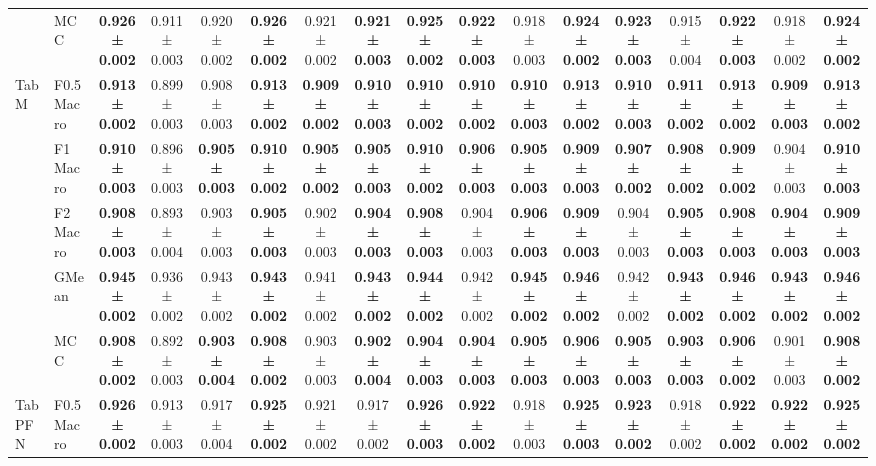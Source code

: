 \begin{table}[H]
{\begin{tabular}{llccccccccccccccc}
 & MCC & \textbf{0.926 ± 0.002} & 0.911 ± 0.003 & 0.920 ± 0.002 & \textbf{0.926 ± 0.002} & 0.921 ± 0.002 & \textbf{0.921 ± 0.003} & \textbf{0.925 ± 0.002} & \textbf{0.922 ± 0.003} & 0.918 ± 0.003 & \textbf{0.924 ± 0.002} & \textbf{0.923 ± 0.003} & 0.915 ± 0.004 & \textbf{0.922 ± 0.003} & 0.918 ± 0.002 & \textbf{0.924 ± 0.002} \\
\cline{1-17}
\multirow[t]{5}{*}{TabM} & F0.5 Macro & \textbf{0.913 ± 0.002} & 0.899 ± 0.003 & 0.908 ± 0.003 & \textbf{0.913 ± 0.002} & \textbf{0.909 ± 0.002} & \textbf{0.910 ± 0.003} & \textbf{0.910 ± 0.002} & \textbf{0.910 ± 0.002} & \textbf{0.910 ± 0.003} & \textbf{0.913 ± 0.002} & \textbf{0.910 ± 0.003} & \textbf{0.911 ± 0.002} & \textbf{0.913 ± 0.002} & \textbf{0.909 ± 0.003} & \textbf{0.913 ± 0.002} \\
 & F1 Macro & \textbf{0.910 ± 0.003} & 0.896 ± 0.003 & \textbf{0.905 ± 0.003} & \textbf{0.910 ± 0.002} & \textbf{0.905 ± 0.002} & \textbf{0.905 ± 0.003} & \textbf{0.910 ± 0.002} & \textbf{0.906 ± 0.003} & \textbf{0.905 ± 0.003} & \textbf{0.909 ± 0.003} & \textbf{0.907 ± 0.002} & \textbf{0.908 ± 0.002} & \textbf{0.909 ± 0.002} & 0.904 ± 0.003 & \textbf{0.910 ± 0.003} \\
 & F2 Macro & \textbf{0.908 ± 0.003} & 0.893 ± 0.004 & 0.903 ± 0.003 & \textbf{0.905 ± 0.003} & 0.902 ± 0.003 & \textbf{0.904 ± 0.003} & \textbf{0.908 ± 0.003} & 0.904 ± 0.003 & \textbf{0.906 ± 0.003} & \textbf{0.909 ± 0.003} & 0.904 ± 0.003 & \textbf{0.905 ± 0.003} & \textbf{0.908 ± 0.003} & \textbf{0.904 ± 0.003} & \textbf{0.909 ± 0.003} \\
 & GMean & \textbf{0.945 ± 0.002} & 0.936 ± 0.002 & 0.943 ± 0.002 & \textbf{0.943 ± 0.002} & 0.941 ± 0.002 & \textbf{0.943 ± 0.002} & \textbf{0.944 ± 0.002} & 0.942 ± 0.002 & \textbf{0.945 ± 0.002} & \textbf{0.946 ± 0.002} & 0.942 ± 0.002 & \textbf{0.943 ± 0.002} & \textbf{0.946 ± 0.002} & \textbf{0.943 ± 0.002} & \textbf{0.946 ± 0.002} \\
 & MCC & \textbf{0.908 ± 0.002} & 0.892 ± 0.003 & \textbf{0.903 ± 0.004} & \textbf{0.908 ± 0.002} & 0.903 ± 0.003 & \textbf{0.902 ± 0.004} & \textbf{0.904 ± 0.003} & \textbf{0.904 ± 0.003} & \textbf{0.905 ± 0.003} & \textbf{0.906 ± 0.003} & \textbf{0.905 ± 0.003} & \textbf{0.903 ± 0.003} & \textbf{0.906 ± 0.002} & 0.901 ± 0.003 & \textbf{0.908 ± 0.002} \\
\cline{1-17}
\multirow[t]{5}{*}{TabPFN} & F0.5 Macro & \textbf{0.926 ± 0.002} & 0.913 ± 0.003 & 0.917 ± 0.004 & \textbf{0.925 ± 0.002} & 0.921 ± 0.002 & 0.917 ± 0.002 & \textbf{0.926 ± 0.003} & \textbf{0.922 ± 0.002} & 0.918 ± 0.003 & \textbf{0.925 ± 0.003} & \textbf{0.923 ± 0.002} & 0.918 ± 0.002 & \textbf{0.922 ± 0.002} & \textbf{0.922 ± 0.002} & \textbf{0.925 ± 0.002} \\

\end{tabular}}
\end{table}
